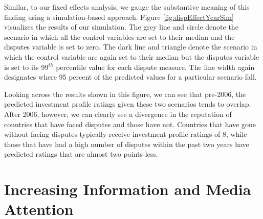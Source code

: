 \documentclass[12pt,onesided]{amsart}
\begin{document}
Similar, to our fixed effects analysis, we gauge the substantive meaning of this finding using a simulation-based approach. Figure \ref{fig:dispEffectYearSim} visualizes the results of our simulation. The grey line and circle denote the scenario in which all the control variables are set to their median and the disputes variable is set to zero. The dark line and triangle denote the scenario in which the control variable are again set to their median but the disputes variable is set to its 99$^{th}$ percentile value for each dispute measure. The line width again designates where 95 percent of the predicted values for a particular scenario fall. 

Looking across the results shown in this figure, we can see that pre-2006, the predicted investment profile ratings given these two scenarios tends to overlap. After 2006, however, we can clearly see a divergence in the reputation of countries that have faced disputes and those have not. Countries that have gone without facing disputes typically receive investment profile ratings of 8, while those that have had a high number of disputes within the past two years have predicted ratings that are almost two points less. 


\section*{Increasing Information and Media Attention}


\end{document}

